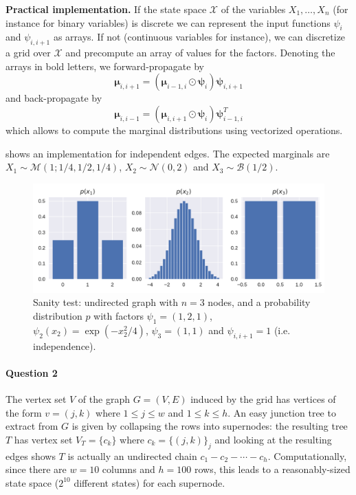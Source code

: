 \documentclass[11pt]{article}
\newcommand{\calM}{\mathcal{M}}
\newcommand{\calN}{\mathcal{N}}
\newcommand{\calX}{\mathcal{X}}
\newcommand{\bmmu}{\boldsymbol{\mu}}
\newcommand{\bmpsi}{\boldsymbol{\psi}}
\begin{document}
\textbf{Practical implementation.} If the state space $\calX$ of the variables $X_1,\ldots,X_n$ (for instance for binary variables) is discrete we can represent the input functions $\psi_i$ and $\psi_{i,i+1}$ as arrays. If not (continuous variables for instance), we can discretize a grid over $\calX$ and precompute an array of values for the factors.
Denoting the arrays in bold letters, we forward-propagate by
\[
	\bmmu_{i, i+1} =
	(\bmmu_{i-1, i} \odot \bmpsi_i)\bmpsi_{i,i+1}
\]
and back-propagate by
\[
	\bmmu_{i,i-1} = (\bmmu_{i,i+1} \odot \bmpsi_i) \bmpsi_{i-1,i}^T
\]
which allows to compute the marginal distributions using vectorized operations.

 shows an implementation for independent edges. The expected marginals are $X_1 \sim \calM(1;1/4,1/2,1/4)$, $X_2\sim \calN(0,2)$ and $X_3 \sim \mathcal{B}(1/2)$.

\begin{figure}
	\centering
	\includegraphics[width=.9\linewidth]{images/graphs/independent_undirected_chain.pdf}
	\caption{Sanity test: undirected graph with $n=3$ nodes, and a probability distribution $p$ with factors $\psi_1 = (1, 2, 1)$, $\psi_2(x_2) = \exp(-x_2^2/4)$, $\psi_3 = (1,1)$ and $\psi_{i,i+1} = 1$ (i.e. independence).}\label{fig:IndependentNodeUGM}
\end{figure}



\paragraph{Question 2} The vertex set $V$ of the graph $G = (V,E)$ induced by the grid has vertices of the form $v = (j,k)$ where $1\leq j \leq w$ and $1 \leq k \leq h$. An easy junction tree to extract from $G$ is given by collapsing the rows into supernodes: the resulting tree $T$ has vertex set $V_T = \{c_k\}$ where $c_k = \{(j,k)\}_j$ and looking at the resulting edges shows $T$ is actually an undirected chain $c_1-c_2 -\cdots-c_h$. Computationally, since there are $w=10$ columns and $h=100$ rows, this leads to a reasonably-sized state space ($2^{10}$ different states) for each supernode.
\end{document}
